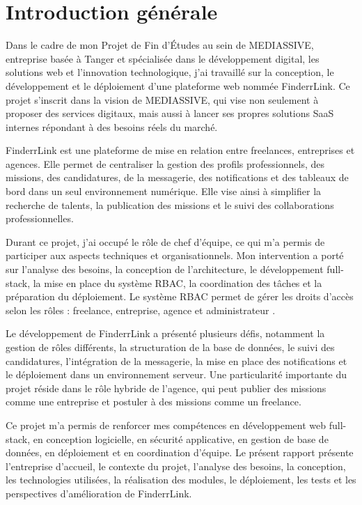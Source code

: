 \chapter*{Introduction générale}


Dans le cadre de mon Projet de Fin d’Études au sein de MEDIASSIVE, entreprise basée à Tanger et spécialisée dans le développement digital, les solutions web et l’innovation technologique, j’ai travaillé sur la conception, le développement et le déploiement d’une plateforme web nommée FinderrLink. Ce projet s’inscrit dans la vision de MEDIASSIVE, qui vise non seulement à proposer des services digitaux, mais aussi à lancer ses propres solutions SaaS internes répondant à des besoins réels du marché.

FinderrLink est une plateforme de mise en relation entre freelances, entreprises et agences. Elle permet de centraliser la gestion des profils professionnels, des missions, des candidatures, de la messagerie, des notifications et des tableaux de bord dans un seul environnement numérique. Elle vise ainsi à simplifier la recherche de talents, la publication des missions et le suivi des collaborations professionnelles.

Durant ce projet, j’ai occupé le rôle de chef d’équipe, ce qui m’a permis de participer aux aspects techniques et organisationnels. Mon intervention a porté sur l’analyse des besoins, la conception de l’architecture, le développement full-stack, la mise en place du système RBAC, la coordination des tâches et la préparation du déploiement. Le système RBAC permet de gérer les droits d’accès selon les rôles : freelance, entreprise, agence et administrateur \cite{owasp}.

Le développement de FinderrLink a présenté plusieurs défis, notamment la gestion de rôles différents, la structuration de la base de données, le suivi des candidatures, l’intégration de la messagerie, la mise en place des notifications et le déploiement dans un environnement serveur. Une particularité importante du projet réside dans le rôle hybride de l’agence, qui peut publier des missions comme une entreprise et postuler à des missions comme un freelance.

Ce projet m’a permis de renforcer mes compétences en développement web full-stack, en conception logicielle, en sécurité applicative, en gestion de base de données, en déploiement et en coordination d’équipe. Le présent rapport présente l’entreprise d’accueil, le contexte du projet, l’analyse des besoins, la conception, les technologies utilisées, la réalisation des modules, le déploiement, les tests et les perspectives d’amélioration de FinderrLink.

